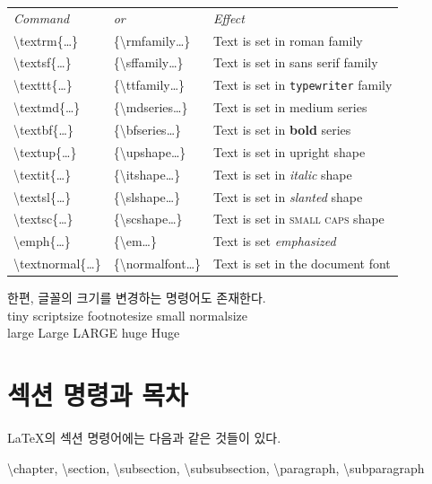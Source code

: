 \documentclass[a4paper, titlepage]{article}
\begin{document}
\begin{center}
\begin{tabularx}{\textwidth}{llX}
\em Command & \em or & \em Effect \\
\textbackslash textrm\{\dots\} & \{\textbackslash rmfamily\dots\} & Text is set in \textrm{roman} family \\
\textbackslash textsf\{\dots\} & \{\textbackslash sffamily\dots\} & Text is set in \textsf{sans serif} family \\
\textbackslash texttt\{\dots\} & \{\textbackslash ttfamily\dots\} & Text is set in \texttt{typewriter} family \\
\textbackslash textmd\{\dots\} & \{\textbackslash mdseries\dots\} & Text is set in \textmd{medium} series \\
\textbackslash textbf\{\dots\} & \{\textbackslash bfseries\dots\} & Text is set in \textbf{bold} series \\
\textbackslash textup\{\dots\} & \{\textbackslash upshape\dots\} & Text is set in \textup{upright} shape \\
\textbackslash textit\{\dots\} & \{\textbackslash itshape\dots\} & Text is set in \textit{italic} shape \\
\textbackslash textsl\{\dots\} & \{\textbackslash slshape\dots\} & Text is set in \textsl{slanted} shape \\
\textbackslash textsc\{\dots\} & \{\textbackslash scshape\dots\} & Text is set in \textsc{small caps} shape \\
\textbackslash emph\{\dots\} & \{\textbackslash em\dots\} & Text is set \em emphasized \\
\textbackslash textnormal\{\dots\} & \{\textbackslash normalfont\dots\} & Text is set in \textnormal{the document} font \\
\end{tabularx}
\end{center}

한편, 글꼴의 크기를 변경하는 명령어도 존재한다. \\
\tiny tiny
\scriptsize scriptsize
\footnotesize footnotesize
\small small
\normalsize normalsize \\
\large large
\Large Large 
\LARGE LARGE
\huge huge
\Huge Huge 

\section{섹션 명령과 목차}
\normalsize
\LaTeX{}의 섹션 명령어에는 다음과 같은 것들이 있다.
\begin{center}
\textbackslash chapter, \textbackslash section, \textbackslash subsection, \textbackslash subsubsection, \textbackslash paragraph, \textbackslash subparagraph
\end{center}
\end{document}
